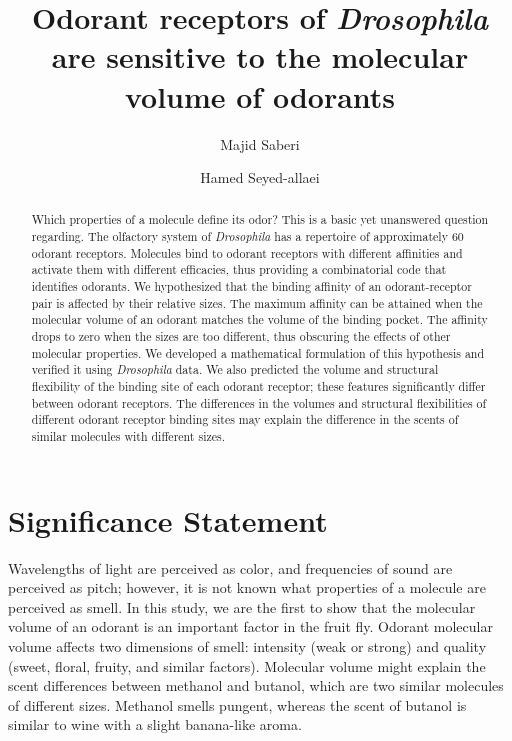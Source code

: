 \documentclass[fleqn,11pt]{wlscirep}
\title{Odorant receptors of \textit{Drosophila} are sensitive to the molecular volume of odorants}
\author[1]{Majid Saberi}
\author[1,*]{Hamed Seyed-allaei}
\affil[1]{School of Cognitive Sciences, Institute for Research in Fundamental Sciences (IPM), Tehran, Iran}
\affil[*]{hamed@ipm.ir}
\begin{document}

\begin{abstract} 
Which properties of a molecule define its odor? This is a basic yet unanswered question regarding. 
The olfactory system of \textit{Drosophila} has a repertoire of approximately 60 odorant receptors. 
Molecules bind to odorant receptors with different affinities and activate them with different efficacies, 
thus providing a combinatorial code that identifies odorants. 
We hypothesized that the binding affinity of an odorant-receptor pair is affected by their relative sizes. 
The maximum affinity can be attained when the molecular volume of an odorant matches the volume of the binding pocket. 
The affinity drops to zero when the sizes are too different, thus obscuring the effects of other molecular properties. 
We developed a mathematical formulation of this hypothesis and verified it using \textit{Drosophila} data. 
We also predicted the volume and structural flexibility of the binding site of each odorant receptor; these features significantly differ between odorant receptors. 
The differences in the volumes and structural flexibilities of different odorant receptor binding sites may explain the difference in the scents of similar molecules with different sizes. 
\end{abstract}

\flushbottom
\maketitle

\thispagestyle{empty}

\section*{Significance Statement}
Wavelengths of light are perceived as color, 
and frequencies of sound are perceived as pitch; 
however, it is not known what properties of a molecule are perceived as smell. 
In this study, we are the first to show that the molecular volume of an odorant is an important factor in the fruit fly. 
Odorant molecular volume affects two dimensions of smell: intensity (weak or strong) and quality (sweet, floral, fruity, and similar factors). 
Molecular volume might explain the scent differences between methanol and butanol, which are two similar molecules of different sizes. 
Methanol smells pungent, whereas the scent of butanol is similar to wine with a slight banana-like aroma.
\end{document}
